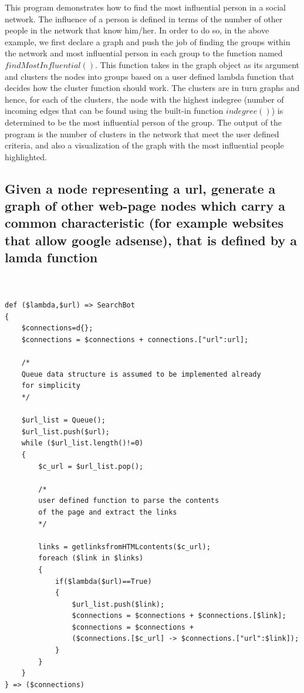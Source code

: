 \documentclass[a4paper]{article}
\begin{document}
\noindent This program demonstrates how to find the most influential person in a social network. The influence of a person is defined in terms of the number of other people in the network that know him/her. In order to do so, in the above example, we first declare a graph and push the job of finding the groups within the network and most influential person in each group to the function named $findMostInfluential()$.  
\newline\newline
This function takes in the graph object as its argument and clusters the nodes into groups based on a user defined lambda function that decides how the cluster function should work. The clusters are in turn graphs and hence, for each of the clusters, the node with the highest indegree (number of incoming edges that can be found using the built-in function $indegree()$) is determined to be the most influential person of the group. The output of the program is the number of clusters in the network that meet the user defined criteria, and also a visualization of the graph with the most influential people highlighted.
\newline

\subsection{Given a node representing a url, generate a graph of other web-page nodes which carry a common characteristic (for example websites that allow google adsense), that is defined by a lamda function}

\begin{verbatim}


def ($lambda,$url) => SearchBot 
{
    $connections=d{};
    $connections = $connections + connections.["url":url];
    
    /*
    Queue data structure is assumed to be implemented already
    for simplicity
    */
    
    $url_list = Queue();
    $url_list.push($url);
    while ($url_list.length()!=0)
    {
        $c_url = $url_list.pop();
        
        /* 
        user defined function to parse the contents
        of the page and extract the links
        */
        
        links = getlinksfromHTMLcontents($c_url);
        foreach ($link in $links)
        {
            if($lambda($url)==True)
            {
                $url_list.push($link);
                $connections = $connections + $connections.[$link];
                $connections = $connections + 
                ($connections.[$c_url] -> $connections.["url":$link]);
            }
        }
    }
} => ($connections)

\end{verbatim}
\end{document}
